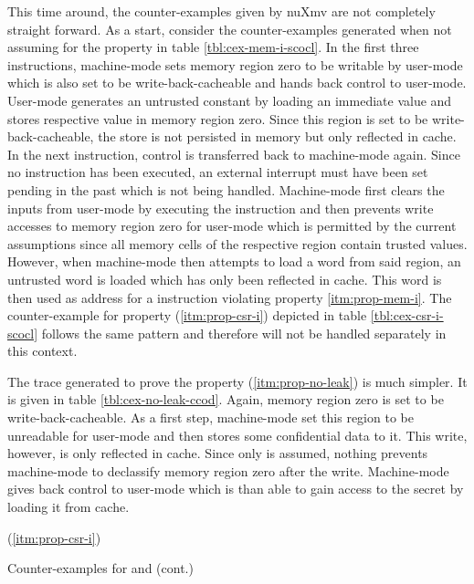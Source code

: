 This time around, the counter-examples given by nuXmv are not completely straight forward.
As a start, consider the counter-examples generated when not assuming  for the  property in table \ref{tbl:cex-mem-i-scocl}.
In the first three instructions, machine-mode sets memory region zero to be writable by user-mode which is also set to be write-back-cacheable and hands back control to user-mode.
User-mode generates an untrusted constant by loading an immediate value and stores respective value in memory region zero.
Since this region is set to be write-back-cacheable, the store is not persisted in memory but only reflected in cache.
In the next instruction, control is transferred back to machine-mode again.
Since no  instruction has been executed, an external interrupt must have been set pending in the past which is not being handled.
Machine-mode first clears the inputs from user-mode by executing the  instruction and then prevents write accesses to memory region zero for user-mode which is permitted by the current assumptions since all memory cells of the respective region contain trusted values.
However, when machine-mode then attempts to load a word from said region, an untrusted word is loaded which has only been reflected in cache.
This word is then used as address for a  instruction violating property \ref{itm:prop-mem-i}.
The counter-example for property  (\ref{itm:prop-csr-i}) depicted in table \ref{tbl:cex-csr-i-scocl} follows the same pattern and therefore will not be handled separately in this context.

The trace generated to prove the  property (\ref{itm:prop-no-leak}) is much simpler.
It is given in table \ref{tbl:cex-no-leak-ccod}.
Again, memory region zero is set to be write-back-cacheable.
As a first step, machine-mode set this region to be unreadable for user-mode and then stores some confidential data to it.
This write, however, is only reflected in cache.
Since only  is assumed, nothing prevents machine-mode to declassify memory region zero after the write.
Machine-mode gives back control to user-mode which is than able to gain access to the secret by loading it from cache.

\begin{table}
    \ContinuedFloat
    \begin{subtable}{\textwidth}
        \centering
        
        \caption{ (\ref{itm:prop-csr-i})}
        \label{tbl:cex-csr-i-scocl}
    \end{subtable}
    \caption{Counter-examples for  and  (cont.)}
\end{table}

